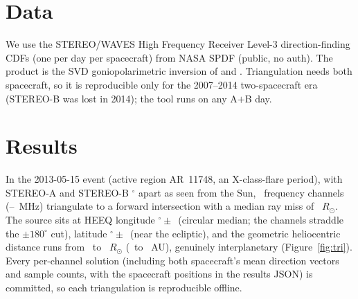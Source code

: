 \documentclass[twocolumn]{aastex631}
\begin{document}
\section{Data}
We use the STEREO/WAVES High Frequency Receiver Level-3 direction-finding CDFs (one per day per
spacecraft) from NASA SPDF (public, no auth). The product is the SVD goniopolarimetric inversion of
\citet{cecconi2008} and \citet{krupar2012}. Triangulation needs both spacecraft, so it is reproducible
only for the 2007--2014 two-spacecraft era (STEREO-B was lost in 2014); the tool runs on any A$+$B day.

\section{Results}
In the 2013-05-15 event (active region AR~11748, an X-class-flare period), with STEREO-A and STEREO-B
\triSep$^\circ$ apart as seen from the Sun, \triNtri\ frequency channels (\triFlo--\triFhi~MHz)
triangulate to a forward intersection with a median ray miss of \triMiss~$R_\odot$. The source sits
at HEEQ longitude \triLon$^\circ\pm$\triLonScatter\ (circular median; the channels straddle the
$\pm180^\circ$ cut), latitude \triLat$^\circ\pm$\triLatScatter\ (near the ecliptic), and the
geometric heliocentric distance runs from \triRlo\ to \triRhi~$R_\odot$ (\triRloAU\ to
\triRhiAU~AU), genuinely interplanetary (Figure~\ref{fig:tri}). Every per-channel solution
(including both spacecraft's mean direction vectors and sample counts, with the spacecraft
positions in the results JSON) is committed, so each triangulation is reproducible offline.
\end{document}

